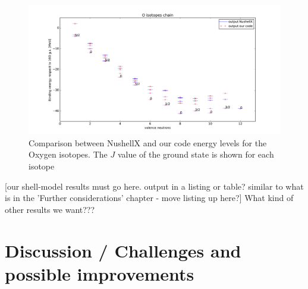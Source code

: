 \documentclass[twoside]{article}
\begin{document}
\begin{figure}[ht]
\centering
\includegraphics[width=1.\textwidth]{isotopes.pdf}
\caption{Comparison between NushellX and our code energy levels for the Oxygen isotopes. The $J$ value of the ground state is shown for each isotope}
\label{fig: isotopes}
\end{figure}

[our shell-model results must go here. output in a listing or table? similar to what is in the 'Further considerations' chapter - move listing up here?] What kind of other results we want???






\section{Discussion / Challenges and possible improvements}
\label{sec:discussion}

\end{document}
